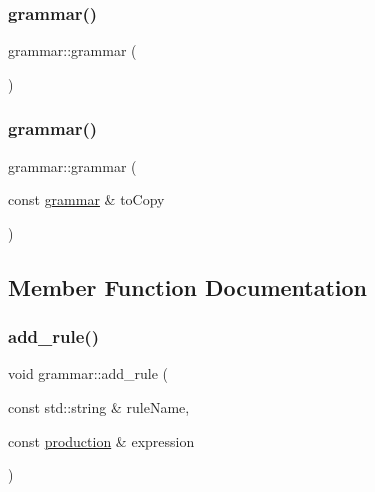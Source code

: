 \subsubsection{\texorpdfstring{grammar()}{grammar()}\hspace{0.1cm}{\footnotesize\ttfamily [2/3]}}
{\footnotesize\ttfamily grammar\+::grammar (\begin{DoxyParamCaption}{ }\end{DoxyParamCaption})\hspace{0.3cm}{\ttfamily [inline]}}

\mbox{\label{classgrammar_af510455ef0446c923c2e263d09860106}} 
\subsubsection{\texorpdfstring{grammar()}{grammar()}\hspace{0.1cm}{\footnotesize\ttfamily [3/3]}}
{\footnotesize\ttfamily grammar\+::grammar (\begin{DoxyParamCaption}\item[{const \mbox{\hyperlink{classgrammar}{grammar}} \&}]{to\+Copy }\end{DoxyParamCaption})\hspace{0.3cm}{\ttfamily [inline]}}



\subsection{Member Function Documentation}
\mbox{\label{classgrammar_abb216d5ac0bb7052b84372f7f13ceb6b}} 
\subsubsection{\texorpdfstring{add\_rule()}{add\_rule()}}
{\footnotesize\ttfamily void grammar\+::add\+\_\+rule (\begin{DoxyParamCaption}\item[{const std\+::string \&}]{rule\+Name,  }\item[{const \mbox{\hyperlink{classproduction}{production}} \&}]{expression }\end{DoxyParamCaption})}

